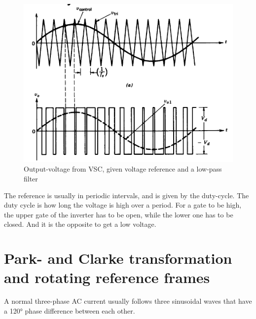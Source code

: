 \begin{figure}
    \centering
    \includegraphics[width=\textwidth,height=\textheight,keepaspectratio]{Figures/PWM_response.png}
    \caption{Output-voltage from \gls{VSC}, given voltage reference and a low-pass filter \cite{Suul_electro_presentation_1}}
    \label{fig:PWM_response}
\end{figure}{}

The reference is usually in periodic intervals, and is given by the duty-cycle. The duty cycle is how long the voltage is high over a period. For a gate to be high, the upper gate of the inverter has to be open, while the lower one has to be closed. And it is the opposite to get a low voltage. 


\section{Park- and Clarke transformation and rotating reference frames}
\label{sec:rotating_reference_frame}
A normal three-phase AC current usually follows three sinusoidal waves that have a \ang{120} phase difference between each other. 

